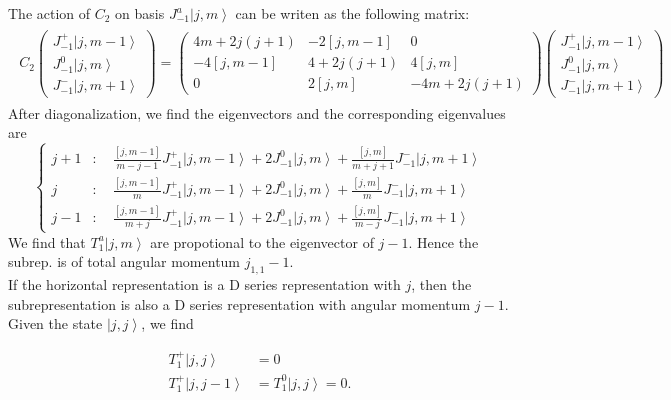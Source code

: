 \documentclass[10pt,a4paper]{article}
\numberwithin{equation}{section}
\newcommand{\ket}[1]{\left| #1 \right\rangle}
\begin{document}
The action of $C_{2}$ on basis $J^{a}_{-1} \ket{j,m}$ can be writen as the following matrix:
\begin{eqnarray}
    \begin{aligned}
        C_{2} 
    \begin{pmatrix}
    J^{+}_{-1} \ket{j,m-1}\\
    J^{0}_{-1} \ket{j,m}\\
    J^{-}_{-1} \ket{j,m+1}
    \end{pmatrix}
    = \begin{pmatrix}
        4m+2j(j+1) & -2 [j,m-1] & 0\\
        -4 [j,m-1] & 4 + 2j(j+1) & 4[j,m]\\
        0 & 2 [j,m] & -4m + 2j(j+1)
    \end{pmatrix}
    \begin{pmatrix}
        J^{+}_{-1} \ket{j,m-1}\\
        J^{0}_{-1} \ket{j,m}\\
        J^{-}_{-1} \ket{j,m+1}
    \end{pmatrix}
    \end{aligned}
\end{eqnarray}
After diagonalization, we find the eigenvectors and the corresponding eigenvalues are 
\begin{equation}
    \left\{
        \begin{aligned}
            j+1 &: \quad \frac{[j,m-1]}{m-j-1} J^{+}_{-1} \ket{j,m-1} + 2 J^{0}_{-1} \ket{j,m} + \frac{[j,m]}{m+j+1} J^{-}_{-1} \ket{j,m+1}\\
            j &: \quad \frac{[j,m-1]}{m} J^{+}_{-1} \ket{j,m-1} + 2 J^{0}_{-1} \ket{j,m} + \frac{[j,m]}{m} J^{-}_{-1} \ket{j,m+1}\\
            j-1 &: \quad \frac{[j,m-1]}{m+j} J^{+}_{-1} \ket{j,m-1} + 2 J^{0}_{-1} \ket{j,m} + \frac{[j,m]}{m-j} J^{-}_{-1} \ket{j,m+1}
        \end{aligned}
    \right.
\end{equation}
We find that $T^{a}_{1} \ket{j,m}$ are propotional to the eigenvector of $j-1$. Hence the subrep. is of total angular momentum $j_{1,1}-1$.\\
If the horizontal representation is a D series representation with $j$, then the subrepresentation is also a D series representation
 with angular momentum $j-1$. Given the state $\ket{j,j}$, we find 

\begin{equation}
    \begin{aligned}
        T^{+}_{1} \ket{j,j} &= 0 \\
        T^{+}_{1} \ket{j,j-1} &= T^{0}_{1} \ket{j,j} = 0.
    \end{aligned}
\end{equation}
\end{document}
